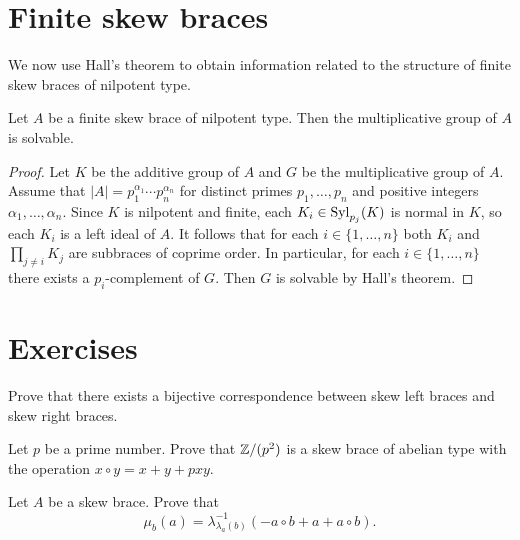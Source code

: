 \section*{Finite skew braces}

We now use Hall's theorem to obtain information related to the
structure of finite skew braces of nilpotent type. 


\begin{theorem}
\label{thm:add_nilpotent}
Let $A$ be a finite skew brace of nilpotent type. Then 
the multiplicative group of $A$ is solvable.
\end{theorem}

\begin{proof}
    Let $K$ be the additive group of $A$ and $G$ be the multiplicative group of $A$. Assume
    that $|A|=p_1^{\alpha_1}\cdots p_n^{\alpha_n}$ for distinct primes $p_1,\dots,p_n$ and positive integers $\alpha_1,\dots ,\alpha_n$. 
    Since $K$ is nilpotent and finite, each $K_i\in\mathrm{Syl}_{p_j}(K)$ is normal in $K$, so 
    each $K_i$ is a left ideal of $A$. It follows that for each $i\in\{1,\dots,n\}$ both $K_i$ and 
    $\prod_{j\ne i}K_j$ are subbraces of coprime order. In particular, for 
    each $i\in\{1,\dots,n\}$ there exists a $p_i$-complement of $G$. 
    Then $G$ is solvable by Hall's theorem. 
\end{proof}

\section{Exercises}


\begin{prob}
\label{prob:left_right}
    Prove that there exists a bijective correspondence between skew left braces and skew right braces. 
\end{prob}

\begin{prob}
Let $p$ be a prime number. Prove that $\mathbb{Z}/(p^2)$ is a skew brace of abelian type with
the operation $x\circ y=x+y+pxy$. 
\end{prob}

\begin{prob}
Let $A$ be a skew brace. 
Prove that 
\[
\mu_b(a)=\lambda^{-1}_{\lambda_a(b)}(-a\circ b+a+a\circ b).
\]
\end{prob}

